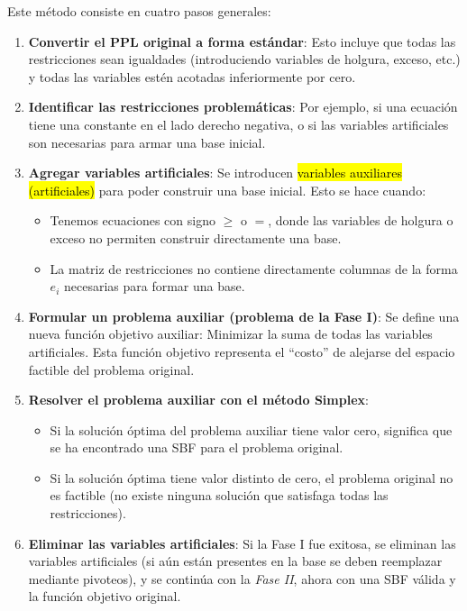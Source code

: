 Este método consiste en cuatro pasos generales:
\begin{enumerate}

  \item \textbf{Convertir el PPL original a forma estándar}: Esto incluye que todas las restricciones sean igualdades (introduciendo variables de holgura, exceso, etc.) y todas las variables estén acotadas inferiormente por cero.

  \item \textbf{Identificar las restricciones problemáticas}: Por ejemplo, si una ecuación tiene una constante en el lado derecho negativa, o si las variables artificiales son necesarias para armar una base inicial.

  \item \textbf{Agregar variables artificiales}: Se introducen \hl{variables auxiliares (artificiales)} para poder construir una base inicial. Esto se hace cuando:
    \begin{itemize}
      \item Tenemos ecuaciones con signo \(\geq\) o \(=\), donde las variables de holgura o exceso no permiten construir directamente una base.
      \item La matriz de restricciones no contiene directamente columnas de la forma \(e_i\) necesarias para formar una base.
    \end{itemize}

  \item \textbf{Formular un problema auxiliar (problema de la Fase I)}: Se define una nueva función objetivo auxiliar: Minimizar la suma de todas las variables artificiales. Esta función objetivo representa el “costo” de alejarse del espacio factible del problema original.

  \item \textbf{Resolver el problema auxiliar con el método Simplex}: 
  \begin{itemize}
    \item Si la solución óptima del problema auxiliar tiene valor cero, significa que se ha encontrado una SBF para el problema original.
    \item Si la solución óptima tiene valor distinto de cero, el problema original no es factible (no existe ninguna solución que satisfaga todas las restricciones).
  \end{itemize}

  \item \textbf{Eliminar las variables artificiales}: Si la Fase I fue exitosa, se eliminan las variables artificiales (si aún están presentes en la base se deben reemplazar mediante pivoteos), y se continúa con la \textit{Fase II}, ahora con una SBF válida y la función objetivo original.
\end{enumerate}

